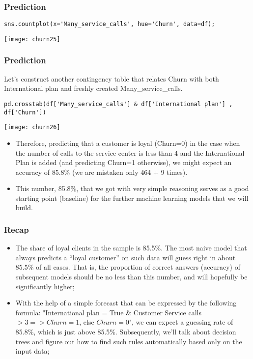 \begin{frame}[fragile]\frametitle{Prediction}	
\begin{lstlisting}
sns.countplot(x='Many_service_calls', hue='Churn', data=df);
\end{lstlisting}
\begin{center}
\texttt{[image: churn25]}
\end{center}
\end{frame}

\begin{frame}[fragile]\frametitle{Prediction}
Let’s construct another contingency table that relates Churn with both International plan and freshly created Many\_service\_calls.	
\begin{lstlisting}
pd.crosstab(df['Many_service_calls'] & df['International plan'] , df['Churn'])
\end{lstlisting}
\begin{center}
\texttt{[image: churn26]}
\end{center}
\begin{itemize}
\item Therefore, predicting that a customer is loyal (Churn=0) in the case when the number of calls to the service center is less than 4 and the International Plan is added (and predicting Churn=1 otherwise), we might expect an accuracy of 85.8\% (we are mistaken only 464 + 9 times). 
\item This number, 85.8\%, that we got with very simple reasoning serves as a good starting point (baseline) for the further machine learning models that we will build.
\end{itemize}

\end{frame}

\begin{frame}[fragile]\frametitle{Recap}
\begin{itemize}
\item The share of loyal clients in the sample is 85.5\%. The most naive model that always predicts a ``loyal customer'' on such data will guess right in about 85.5\% of all cases. 
That is, the proportion of correct answers (accuracy) of subsequent models should be no less than this number, and will hopefully be significantly higher;
\item With the help of a simple forecast that can be expressed by the following formula: "International plan = True \& Customer Service calls $> 3 => Churn = 1$, else $Churn = 0$", we can expect a guessing rate of 85.8\%, which is just above 85.5\%. Subsequently, we'll talk about decision trees and figure out how to find such rules automatically based only on the input data;
\end{itemize}

\end{frame}

